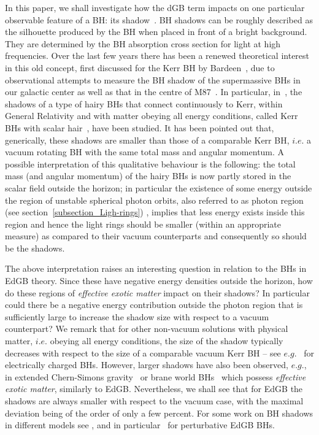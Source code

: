 \documentclass[12pt]{article}
\begin{document}
 In this paper, we shall investigate 
how the dGB term impacts on one particular observable feature of a BH: its shadow~\cite{Falcke:1999pj}.
 BH shadows can be roughly described as the silhouette produced by the BH when placed in front of a bright background. 
They are determined by the BH  absorption cross section for light 
at high frequencies.  Over the last few years there has been a renewed theoretical interest in this old concept, 
first discussed for the Kerr BH by Bardeen~\cite{Bardeen:1973tla}, due to observational attempts to measure the BH shadow of the supermassive BHs in our galactic center as well as that in the centre of M87~\cite{Lu:2014zja}. In particular, in~\cite{Cunha:2015yba,Vincent:2016sjq,Cunha:2016bjh}, the shadows of a type of hairy BHs that connect continuously to Kerr, within General Relativity and with matter obeying all energy conditions, called Kerr BHs with scalar hair~\cite{Herdeiro:2014goa,Herdeiro:2014ima,Herdeiro:2015gia}, have been studied. It has been pointed out that, generically, these shadows are smaller than those of a comparable Kerr BH, $i.e.$ a vacuum rotating BH with the same total mass and angular momentum. A possible interpretation of this qualitative behaviour is the following:  the total mass (and angular momentum) of the hairy BHs is now partly stored in the scalar field outside the horizon; in particular the existence of some energy outside the 
region of unstable spherical photon orbits, also referred to as photon region (see section~\ref{subsection_Ligh-rings}) \cite{Grenzebach:2014fha}, implies that less energy exists inside this region and hence the light rings should be smaller (within an appropriate measure) as compared to their vacuum counterparts and consequently so should be the shadows. 
 
\bigskip

The above interpretation raises an interesting question in relation to the BHs in EdGB theory. 
Since these have negative energy densities outside the horizon, 
how do these regions of \textit{effective exotic matter} impact on their shadows? 
In particular could there be a negative energy contribution 
outside the photon region that is sufficiently large to increase the shadow size with respect to a vacuum counterpart? 
We remark that for other non-vacuum solutions with physical matter, $i.e.$ obeying all energy conditions, the size of the shadow typically decreases with respect to the size of a comparable vacuum Kerr BH -- see $e.g.$~\cite{Takahashi:2005hy} for electrically charged BHs. 
However, larger shadows have also been observed, $e.g.$, in extended Chern-Simons gravity~\cite{Amarilla:2010zq} 
or brane world BHs~\cite{Amarilla:2011fx} which possess \textit{effective exotic matter}, similarly to EdGB.
Nevertheless, we shall see that for EdGB the shadows are always smaller with respect to the vacuum case, with the maximal deviation being of the order of only a few percent. For some work on BH shadows in different models see \cite{Cunha:2015yba,Grenzebach:2014fha,Amarilla:2010zq, Amarilla:2011fx, Tretyakova:2016ale, Abdolrahimi:2015rua, Abdolrahimi:2015kma, Shipley:2016omi, Abdujabbarov:2016hnw, Amir:2016cen, Johannsen:2015qca,Amarilla:2013sj}, and in particular~\cite{Younsi:2016azx} for perturbative EdGB BHs.
 
\end{document}
